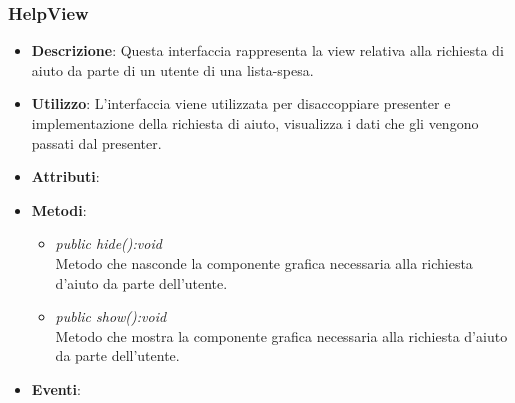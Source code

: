 \subsubsection{HelpView}
\begin{itemize}
\item \textbf{Descrizione}: Questa interfaccia rappresenta la view relativa alla richiesta di aiuto da parte di un utente di una lista-spesa.
\item \textbf{Utilizzo}: L'interfaccia viene utilizzata per disaccoppiare presenter e implementazione della richiesta di aiuto, visualizza i dati che gli vengono passati dal presenter.
\item \textbf{Attributi}:
\item \textbf{Metodi}:
	\begin{itemize}
	\item \textit{public hide():void}\\
	Metodo che nasconde la componente grafica necessaria alla richiesta d'aiuto da parte dell'utente.
	\item \textit{public show():void}\\
	Metodo che mostra la componente grafica necessaria alla richiesta d'aiuto da parte dell'utente.
	\end{itemize}
\item \textbf{Eventi}:
\end{itemize}

